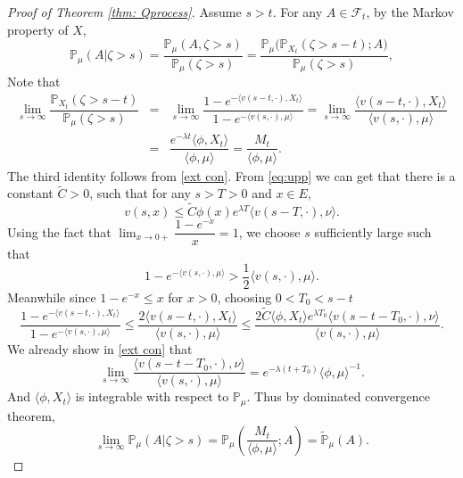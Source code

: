 \documentclass[12pt,a4paper]{amsart}
\theoremstyle{plain}
\theoremstyle{definition}
\numberwithin{equation}{section}
\begin{document}
\begin{proof}[Proof of Theorem \ref{thm: Qprocess}]
Assume $s>t$.  For any $A\in\mathscr F_t$, by the Markov property of $X$,
\[
\mathbb P_\mu(A|\zeta>s)=\dfrac{\mathbb P_\mu(A, \zeta>s)}{\mathbb P_\mu(\zeta>s)}=\dfrac{\mathbb P_\mu\big(\mathbb P_{X_t}(\zeta>s-t);A\big)}{\mathbb P_\mu(\zeta>s)},
\]
 Note that
\begin{eqnarray*}
\lim_{s\rightarrow\infty}\dfrac{\mathbb P_{X_t}(\zeta>s-t)}{\mathbb P_\mu(\zeta>s)}
&=&\lim_{s\rightarrow\infty}\dfrac{1-e^{-\langle v(s-t,\cdot),X_t\rangle }}{1-e^{-\langle v(s,\cdot),\mu\rangle }}
=\lim_{s\rightarrow\infty}\dfrac{\langle v(s-t,\cdot),X_t\rangle }{\langle v(s,\cdot),\mu\rangle }\\
&=& \dfrac{e^{-\lambda t}\langle \phi, X_t\rangle }{\langle \phi,\mu\rangle }=\dfrac{M_t}{\langle \phi,\mu\rangle }.
\end{eqnarray*}
The third identity follows from \eqref{ext con}.  From \eqref{eq:upp} we can get that there is a constant $\widetilde C>0$, such that for any $s>T>0$ and $x\in E$,
\[
v(s,x)\leq \widetilde C\phi(x)e^{\lambda T}\langle v(s-T,\cdot),\nu\rangle .
\]
Using the fact that $\lim_{x\rightarrow 0+}\dfrac{1-e^{-x}}{x}=1$, we choose $s$ sufficiently large such that
\[
1-e^{-\langle v(s,\cdot),\mu\rangle }>\frac{1}{2}\langle v(s,\cdot),\mu\rangle .
\]
Meanwhile since $1-e^{-x}\leq x$ for $x>0$, choosing $0<T_0<s-t$
\[
\dfrac{1-e^{-\langle v(s-t,\cdot),X_t\rangle }}{1-e^{-\langle v(s,\cdot),\mu\rangle }}
\leq \dfrac{2\langle v(s-t,\cdot),X_t\rangle }{\langle v(s,\cdot),\mu\rangle }\leq \dfrac{2\widetilde C\langle \phi,X_t\rangle e^{\lambda T_0}\langle v(s-t-T_0,\cdot),\nu\rangle }{\langle v(s,\cdot),\mu\rangle }.
\]
We already show in \eqref{ext con} that
\[
\lim_{s\rightarrow\infty}\dfrac{\langle v(s-t-T_0,\cdot),\nu\rangle }{\langle v(s,\cdot),\mu\rangle }
=e^{-\lambda(t+T_0)}\langle \phi,\mu\rangle ^{-1}.
\]
And $\langle \phi,X_t\rangle $ is integrable with respect to $\mathbb P_\mu$.  Thus by dominated convergence theorem,
\[
\lim_{s\rightarrow\infty}\mathbb P_\mu(A|\zeta>s)=\mathbb P_\mu\left(\frac{M_t}{\langle\phi,\mu\rangle };A\right)=\widetilde{\mathbb P}_\mu(A).
\]
\end{proof}
\end{document}
